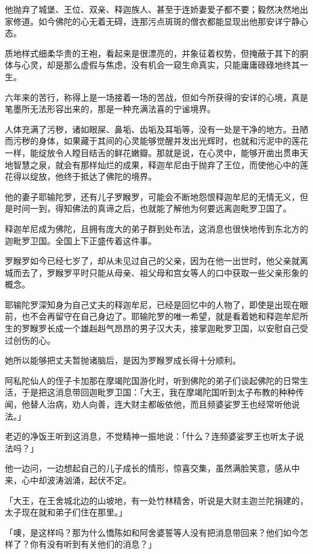 \documentclass[twoside,openany]{book}
\begin{document}
他抛弃了城堡、王位、双亲、释迦族人、甚至于连娇妻爱子都不要；毅然决然地出家修道。如今佛陀的心无着无碍，连那污点斑斑的僧衣都能显现出他那安详宁静心态。

质地样式细柔华贵的王袍，看起来是很漂亮的，并象征着权势，但掩蔽于其下的胴体与心灵，却是那么虚假与焦虑，没有机会一窥生命真实，只能庸庸碌碌地终其一生。

六年来的苦行，称得上是一场接着一场的苦战，但如今所获得的安详的心境，真是笔墨所无法形容出来的，那是一种充满法喜的宁谧境界。

人体充满了污秽，诸如眼屎、鼻垢、齿垢及耳垢等，没有一处是干净的地方。丑陋而污秽的身体，如果藏于其间的心灵能够觉醒并发出光辉时，也就和污泥中的莲花一样，能绽放令人瞠目结舌的鲜花嫩瓣。那就是说，在心灵中，能够开凿出贯串天地智慧之泉，就会有那样灿烂的成果，释迦牟尼由于抛弃了王位，而使他心中的莲花得以绽放，他终于抵达了佛陀的境界。

他的妻子耶输陀罗，还有儿子罗睺罗，可能会不断地怨恨释迦牟尼的无情无义，但是时间一到，得知佛法的真谛之后，也就能了解他为何要远离迦毗罗卫国了。

释迦牟尼成为佛陀，且拥有庞大的弟子群到处布法，这消息也很快地传到东北方的迦毗罗卫国。全国上下正盛传着这件事。

罗睺罗如今已经七岁了，却从未见过自己的父亲，因为在他一出世时，他父亲就离城而去了，罗睺罗平时只能从母亲、祖父母和宫女等人的口中获取一些父亲形象的概念。

耶输陀罗深知身为自己丈夫的释迦牟尼，已经是回忆中的人物了，即使是出现在眼前，也不会再留守在自己身边了。耶输陀罗的唯一希望，就是看着她和释迦牟尼所生的罗睺罗长成一个雄赳赳气昂昂的男子汉大夫，接掌迦毗罗卫国，以安慰自己受过创伤的心。

她所以能够把丈夫暂抛诸脑后，是因为罗睺罗成长得十分顺利。

阿私陀仙人的侄子卡加那在摩竭陀国游化时，听到佛陀的弟子们谈起佛陀的日常生活，于是把这消息带回迦毗罗卫国：「大王，我在摩竭陀国听到太子布教的种种传闻，他替人治病，劝人向善，连大财主都皈依他，而且频婆娑罗王也经常听他说法。」

老迈的净饭王听到这消息，不觉精神一振地说：「什么？连频婆娑罗王也听太子说法吗？」

他一边问，一边想起自己的儿子成长的情形，惊喜交集，虽然满脸笑意，感从中来，心中却波涛汹涌，起伏不定。

「大王，在王舍城北边的山坡地，有一处竹林精舍，听说是大财主迦兰陀捐建的，太子现在就和弟子们住在那里。」

「噢，是这样吗？那为什么憍陈如和阿舍婆誓等人没有把消息带回来？他们如今怎样了？你有没有听到有关他们的消息？」
\end{document}
